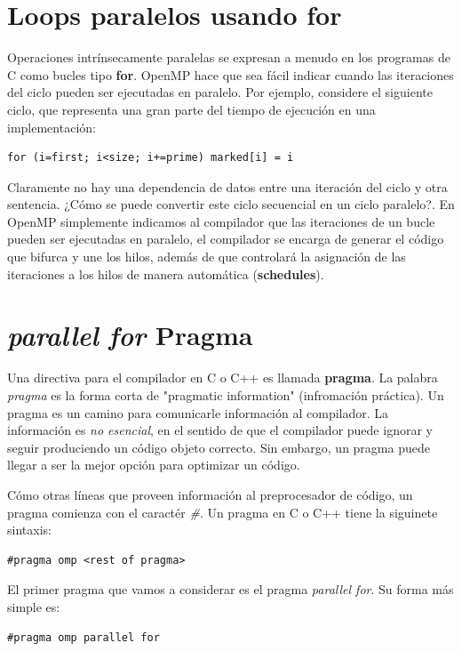 \documentclass[12pt,letterpaper]{book}
\begin{document}
\section{Loops paralelos usando for}
Operaciones intrínsecamente paralelas se expresan a menudo en los programas de C como bucles tipo \textbf{for}. OpenMP hace que sea fácil indicar cuando las iteraciones del ciclo pueden ser ejecutadas en paralelo. Por ejemplo, considere el siguiente ciclo, que representa una gran parte del tiempo de ejecución en una implementación:

\begin{lstlisting}[style=C]
for (i=first; i<size; i+=prime) marked[i] = i
\end{lstlisting}

Claramente no hay una dependencia de datos entre una iteración del ciclo y otra sentencia. ¿Cómo se puede convertir este ciclo secuencial en un ciclo paralelo?. En OpenMP simplemente indicamos al compilador que las iteraciones de un bucle pueden ser ejecutadas en paralelo, el compilador se encarga de generar el código que bifurca y une los hilos, además de que controlará la asignación de las iteraciones a los hilos de manera automática (\textbf{schedules}).

\section{\textit{parallel for} \textbf{Pragma}}
Una directiva para el compilador en C o C++ es llamada \textbf{pragma}. La palabra \textit{pragma} es la forma corta de "pragmatic information" (infromación práctica). Un pragma  es un camino para comunicarle información al compilador. La información es \textit{no esencial}, en el sentido de que el compilador puede ignorar y seguir produciendo un código objeto correcto. Sin embargo, un pragma puede llegar a ser la mejor opción para optimizar un código.

Cómo otras líneas que proveen información al preprocesador de código, un pragma comienza con el caractér \textit{\#}. Un pragma en C o C++ tiene la siguinete sintaxis:

\begin{lstlisting}[style=C]
#pragma omp <rest of pragma>
\end{lstlisting}

El primer pragma que vamos a considerar es el pragma \textit{parallel for}. Su forma más simple es:

\begin{lstlisting}[style=C]
#pragma omp parallel for
\end{lstlisting}
\end{document}
